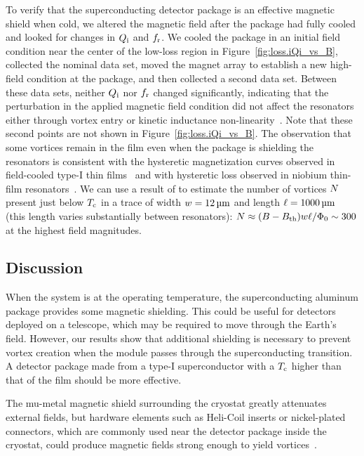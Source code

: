 To verify that the superconducting detector package is an effective magnetic shield when cold, we altered the magnetic field after the package had fully cooled and looked for changes in $Q_{\mathrm{i}}$ and $f_{\mathrm{r}}$.
We cooled the package in an initial field condition near the center of the low-loss region in Figure~\ref{fig:loss.iQi_vs_B}, collected the nominal data set, moved the magnet array to establish a new high-field condition at the package, and then collected a second data set.
Between these data sets, neither $Q_{\mathrm{i}}$ nor $f_{\mathrm{r}}$ changed significantly, indicating that the perturbation in the applied magnetic field condition did not affect the resonators either through vortex entry or kinetic inductance non-linearity~\autocite{Healey2008APL,Zmuidzinas2012ARCMP}.
Note that these second points are not shown in Figure~\ref{fig:loss.iQi_vs_B}.
The observation that some vortices remain in the film even when the package is shielding the resonators is consistent with the hysteretic magnetization curves observed in field-cooled type-I thin films~\autocite{Chang1963PL,Miller1964RMP} and with hysteretic loss observed in niobium thin-film resonators~\autocite{Bothner2012PRB}.
We can use a result of \textcite{Stan2004PRL} to estimate the number of vortices $N$ present just below $T_{\mathrm{c}}$ in a trace of width $w = \SI{12}{\micro m}$ and length $\ell = \SI{1000}{\micro m}$ (this length varies substantially between resonators):
$N
  \approx
  (B - B_{\mathrm{th}}) w \ell / \Phi_0
  \sim
  300$
at the highest field magnitudes.

\subsection{Discussion}

When the system is at the operating temperature, the superconducting aluminum package provides some magnetic shielding.
This could be useful for detectors deployed on a telescope, which may be required to move through the Earth's field.
However, our results show that additional shielding is necessary to prevent vortex creation when the module passes through the superconducting transition.
A detector package made from a type-I superconductor with a $T_{\mathrm{c}}$ higher than that of the film should be more effective.

The mu-metal magnetic shield surrounding the cryostat greatly attenuates external fields, but hardware elements such as Heli-Coil inserts or nickel-plated connectors, which are commonly used near the detector package inside the cryostat, could produce magnetic fields strong enough to yield vortices~\autocite{Wang2009APL,Chiaro2016SUST}.

